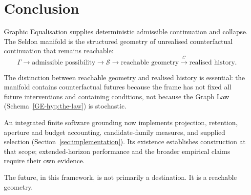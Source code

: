 \documentclass[11pt,a4paper]{article}
\theoremstyle{remark}
\newcommand{\Seldon}{\mathcal S}
\begin{document}
\section{Conclusion}\label{sec:conclusion}

Graphic Equalisation supplies deterministic admissible continuation and collapse. The Seldon manifold is the structured geometry of unrealised counterfactual continuation that remains reachable:
\[
\boxed{
\Gamma
\rightarrow
\text{admissible possibility}
\rightarrow
\Seldon
\rightarrow
\text{reachable geometry}
\xrightarrow{\mathcal C}
\text{realised history}.
}
\]

The distinction between reachable geometry and realised history is essential: the manifold contains counterfactual futures because the frame has not fixed all future interventions and containing conditions, not because the Graph Law (Schema~\ref{GE-hyp:the-law}) is stochastic.

An integrated finite software grounding now implements projection, retention,
aperture and budget accounting, candidate-family measures, and supplied selection
(Section~\ref{sec:implementation}). Its existence establishes construction at that
scope; extended-horizon performance and the broader empirical claims require their
own evidence.

The future, in this framework, is not primarily a destination. It is a reachable geometry.
\end{document}
